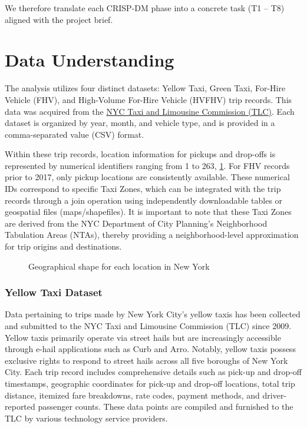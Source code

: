 \documentclass[conference]{IEEEtran}
\begin{document}
We therefore translate each CRISP-DM phase into a concrete task
(T1 – T8) aligned with the project brief.


\section{Data Understanding}
The analysis utilizes four distinct datasets: Yellow Taxi, Green Taxi, For-Hire Vehicle (FHV), and High-Volume
For-Hire Vehicle (HVFHV) trip records. This data was acquired from the
\href{https://www.nyc.gov/site/tlc/about/tlc-trip-record-data.page}{NYC Taxi and Limousine Commission (TLC)}.
Each dataset is organized by year, month, and vehicle type, and is provided in a comma-separated value (CSV) format.

Within these trip records, location information for pickups and drop-offs is represented by numerical identifiers
ranging from 1 to 263, \ref{fig:nyc-zones-map}. For FHV records prior to 2017, only pickup locations are consistently
available. These numerical IDs correspond to specific Taxi Zones, which can be integrated with the trip records through
a join operation using independently downloadable tables or geospatial files (maps/shapefiles). It is important to note
that these Taxi Zones are derived from the NYC Department of City Planning's Neighborhood Tabulation Areas (NTAs),
thereby providing a neighborhood-level approximation for trip origins and destinations.

\begin{figure}[htbp]
  \label{fig:nyc-zones-map}
  \centering
  
  \caption{Geographical shape for each location in New York}
\end{figure}

\subsubsection*{Yellow Taxi Dataset}
Data pertaining to trips made by New York City's yellow taxis has been collected and submitted to the NYC Taxi and
Limousine Commission (TLC) since 2009. Yellow taxis primarily operate via street hails but are increasingly accessible
through e-hail applications such as Curb and Arro. Notably, yellow taxis possess exclusive rights to respond to street
hails across all five boroughs of New York City.
Each trip record includes comprehensive details such as pick-up and drop-off timestamps, geographic coordinates for
pick-up and drop-off locations, total trip distance, itemized fare breakdowns, rate codes, payment methods, and
driver-reported passenger counts. These data points are compiled and furnished to the TLC by various technology
service providers.
\end{document}
